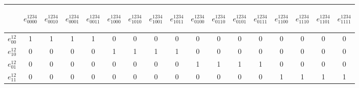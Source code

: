 \begin{table}[!ht]
\centering
\begin{tabular}{ r || c | c | c | c | c | c | c | c | c | c | c | c | c | c | c | c }
		 &	\begin{sideways}$e^{1234}_{0000}$\end{sideways} & \begin{sideways}$e^{1234}_{0010}$\end{sideways} & \begin{sideways}$e^{1234}_{0001}$\end{sideways} & \begin{sideways}$e^{1234}_{0011}$\end{sideways}
			  & \begin{sideways}$e^{1234}_{1000}$\end{sideways} & \begin{sideways}$e^{1234}_{1010}$\end{sideways} & \begin{sideways}$e^{1234}_{1001}$\end{sideways} & \begin{sideways}$e^{1234}_{1011}$\end{sideways}
			  &	\begin{sideways}$e^{1234}_{0100}$\end{sideways} & \begin{sideways}$e^{1234}_{0110}$\end{sideways} & \begin{sideways}$e^{1234}_{0101}$\end{sideways} & \begin{sideways}$e^{1234}_{0111}$\end{sideways}
			  &	\begin{sideways}$e^{1234}_{1100}$\end{sideways} & \begin{sideways}$e^{1234}_{1110}$\end{sideways} & \begin{sideways}$e^{1234}_{1101}$\end{sideways} & \begin{sideways}$e^{1234}_{1111}$\end{sideways}\\ \hline \hline
    $e^{12}_{00}$ & 1 & 1 & 1 & 1 & 0 & 0 & 0 & 0 & 0 & 0 & 0 & 0 & 0 & 0 & 0 & 0\\ \hline
    $e^{12}_{10}$ & 0 & 0 & 0 & 0 & 1 & 1 & 1 & 1 & 0 & 0 & 0 & 0 & 0 & 0 & 0 & 0\\ \hline
    $e^{12}_{01}$ & 0 & 0 & 0 & 0 & 0 & 0 & 0 & 0 & 1 & 1 & 1 & 1 &  0 & 0 & 0 & 0\\ \hline
    $e^{12}_{11}$ & 0 & 0 & 0 & 0 & 0 & 0 & 0 & 0 & 0 & 0 & 0 & 0 & 1 & 1 & 1 & 1\\ \hline


\end{tabular}
\end{table}

